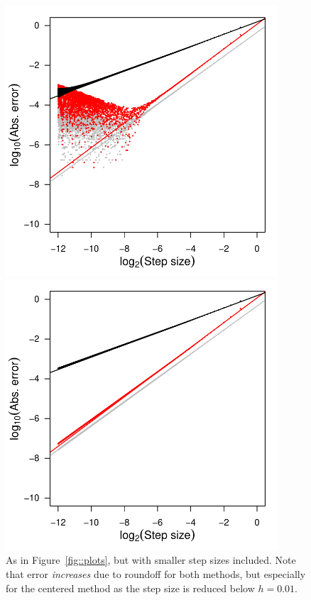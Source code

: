 \documentclass[11pt]{article}
\begin{document}
\begin{figure}[ht!]\centering
\begin{minipage}{0.48\textwidth}
\includegraphics[width=0.9\textwidth]{4_differentiation/step_size_roundoff_8.pdf}

\end{minipage}
\begin{minipage}{0.48\textwidth}
\includegraphics[width=0.9\textwidth]{4_differentiation/step_size_roundoff_16.pdf}
\end{minipage}

\caption{As in Figure~\ref{fig::plots}, but with smaller step sizes included. Note that error \textit{increases} due to roundoff for both methods, but especially for the centered method as the step size is reduced below \(h = 0.01\).}\label{fig::roundoff}
\end{figure}
\end{document}
